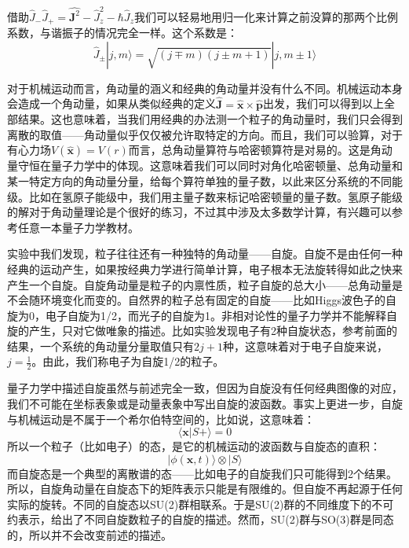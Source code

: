 \documentclass{ctexart}
\begin{document}
借助$\hat{J}_-\hat{J}_+=\hat{\bm{J}^2}-\hat{J}_z^2-\hbar\hat{J}_z$我们可以轻易地用归一化来计算之前没算的那两个比例系数，与谐振子的情况完全一样。这个系数是：
\begin{equation}
\hat{J}_\pm|j,m\rangle=\sqrt{(j\mp m)(j\pm m+1)}|j,m\pm 1\rangle
\end{equation}

对于机械运动而言，角动量的涵义和经典的角动量并没有什么不同。机械运动本身会造成一个角动量，如果从类似经典的定义$\hat{\bm{J}}=\hat{\bm{x}}\times\hat{\bm{p}}$出发，我们可以得到以上全部结果。这也意味着，当我们用经典的办法测一个粒子的角动量时，我们只会得到离散的取值——角动量似乎仅仅被允许取特定的方向。而且，我们可以验算，对于有心力场$V(\hat{\bm{x}})=V(r)$而言，总角动量算符与哈密顿算符是对易的。这是角动量守恒在量子力学中的体现。这意味着我们可以同时对角化哈密顿量、总角动量和某一特定方向的角动量分量，给每个算符单独的量子数，以此来区分系统的不同能级。比如在氢原子能级中，我们用主量子数来标记哈密顿量的量子数。氢原子能级的解对于角动量理论是个很好的练习，不过其中涉及太多数学计算，有兴趣可以参考任意一本量子力学教材。

实验中我们发现，粒子往往还有一种独特的角动量——自旋。自旋不是由任何一种经典的运动产生，如果按经典力学进行简单计算，电子根本无法旋转得如此之快来产生一个自旋。自旋角动量是粒子的内禀性质，粒子自旋的总大小——总角动量是不会随环境变化而变的。自然界的粒子总有固定的自旋——比如Higgs波色子的自旋为0，电子自旋为1/2，而光子的自旋为1。非相对论性的量子力学并不能解释自旋的产生，只对它做唯象的描述。比如实验发现电子有2种自旋状态，参考前面的结果，一个系统的角动量分量取值只有$2j+1$种，这意味着对于电子自旋来说，$j=\frac{1}{2}$。由此，我们称电子为自旋1/2的粒子。

量子力学中描述自旋虽然与前述完全一致，但因为自旋没有任何经典图像的对应，我们不可能在坐标表象或是动量表象中写出自旋的波函数。事实上更进一步，自旋与机械运动是不属于一个希尔伯特空间的，比如说，这意味着：
\begin{equation}
\langle\bm{x}|S+\rangle=0
\end{equation}
所以一个粒子（比如电子）的态，是它的机械运动的波函数与自旋态的直积：
\begin{equation}
|\phi(\bm{x},t)\rangle\otimes|S\rangle
\end{equation}
而自旋态是一个典型的离散谱的态——比如电子的自旋我们只可能得到2个结果。所以，自旋角动量在自旋态下的矩阵表示只能是有限维的。但自旋不再起源于任何实际的旋转。不同的自旋态以SU(2)群相联系。于是SU(2)群的不同维度下的不可约表示，给出了不同自旋数粒子的自旋的描述。然而，SU(2)群与SO(3)群是同态的，所以并不会改变前述的描述。
\end{document}
